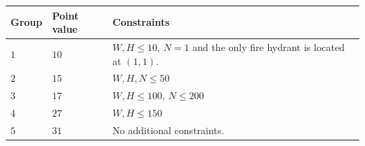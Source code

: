 \noindent
\begin{tabular}{| l | l | p{12cm} |}
  \hline
  \textbf{Group} & \textbf{Point value} & \textbf{Constraints} \\ \hline
  $1$    & $10$       & $W,H \le 10$, $N=1$ and the only fire hydrant is located at $(1,1)$. \\ \hline
  $2$    & $15$       & $W,H,N \le 50$ \\ \hline
  $3$    & $17$       & $W,H \le 100$, $N\le 200$\\ \hline
  $4$    & $27$       & $W,H \le 150$ \\ \hline
  $5$    & $31$       & No additional constraints. \\ \hline
\end{tabular}
